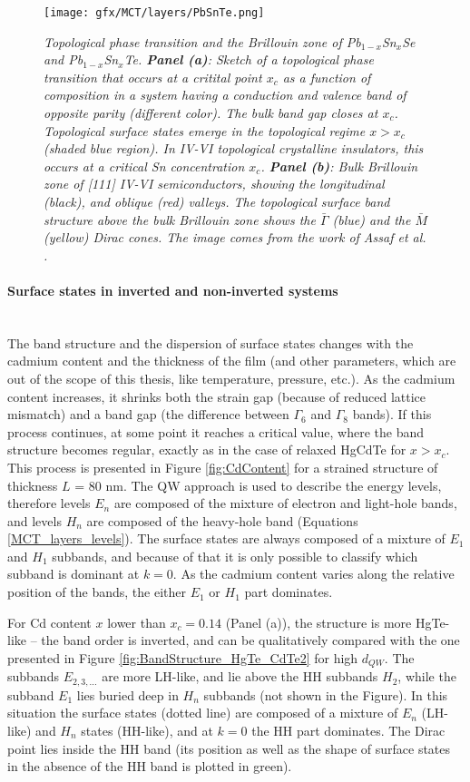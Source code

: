 \documentclass[titlepage,a4paper]{book}
\newcommand{\wciecie}{\quad\phantom{v}}
\newcommand{\myparagraph}[1]{\paragraph{#1}\mbox{}\\}
\begin{document}
\begin{figure}[H]
	\centering
	\texttt{[image: gfx/MCT/layers/PbSnTe.png]}
	\vspace{-10pt}
	\caption{\textit{Topological phase transition and the Brillouin zone of Pb$_{1-x}$Sn$_x$Se and Pb$_{1-x}$Sn$_x$Te. \textbf{Panel (a)}: Sketch of a topological phase transition that occurs at a critital point $x_c$ as a function of composition in a system having a conduction and valence band of opposite parity (different color). The bulk band gap closes at $x_c$. Topological surface states emerge in the topological regime $x > x_c$ (shaded blue region). In IV-VI topological crystalline insulators, this occurs at a critical Sn concentration $x_c$. \textbf{Panel (b)}: Bulk Brillouin zone of [111] IV-VI semiconductors, showing the longitudinal (black), and oblique (red) valleys. The topological surface band structure above the bulk Brillouin zone shows the $\bar{\Gamma}$ (blue) and the $\bar{M}$ (yellow) Dirac cones. The image comes from the work of Assaf \textit{et al.} \cite{Assaf_MCT_layers1}.}}
	\label{fig:PbSnTe_MCT_layers}
\end{figure} 

\myparagraph{Surface states in inverted and non-inverted systems}
\wciecie
The band structure and the dispersion of surface states changes with the cadmium content and the thickness of the film (and other parameters, which are out of the scope of this thesis, like temperature, pressure, etc.). As the cadmium content increases, it shrinks both the strain gap (because of reduced lattice mismatch) and a band gap (the difference between $\Gamma_6$ and $\Gamma_8$ bands). If this process continues, at some point it reaches a critical value, where the band structure becomes regular, exactly as in the case of relaxed HgCdTe for $x > x_c$. This process is presented in Figure \ref{fig:CdContent} for a strained structure of thickness $L$ = 80 nm. The QW approach is used to describe the energy levels, therefore levels $E_n$ are composed of the mixture of electron and light-hole bands, and levels $H_n$ are composed of the heavy-hole band (Equations \ref{MCT_layers_levels}). The surface states are always composed of a mixture of $E_1$ and $H_1$ subbands, and because of that it is only possible to classify which subband is dominant at $k = 0$. As the cadmium content varies along the relative position of the bands, the either $E_1$ or $H_1$ part dominates. 

For Cd content $x$ lower than $x_c = 0.14$ (Panel (a)), the structure is more HgTe-like -- the band order is inverted, and can be qualitatively compared with the one presented in Figure \ref{fig:BandStructure_HgTe_CdTe2} for high $d_{QW}$. The subbands $E_{2,3,...}$ are more LH-like, and lie above the HH subbands $H_2$, while the subband $E_1$ lies buried deep in $H_n$ subbands (not shown in the Figure). In this situation the surface states (dotted line) are composed of a mixture of $E_n$ (LH-like) and $H_n$ states (HH-like), and at $k = 0$ the HH part dominates. The Dirac point lies inside the HH band (its position as well as the shape of surface states in the absence of the HH band is plotted in green).
\end{document}
